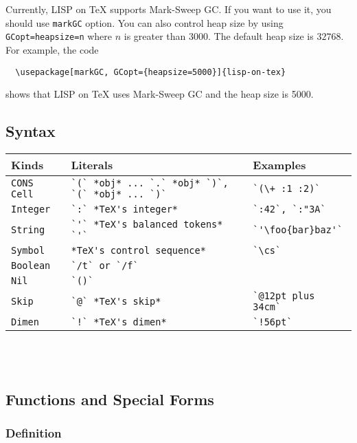 \documentclass[10pt,a4paper]{article}
\begin{document}
Currently, LISP on TeX supports Mark-Sweep GC.
If you want to use it, you should use \texttt{markGC} option.
You can also control heap size by using \texttt{GCopt={heapsize=n}}
where $n$ is greater than $3000$. The default heap size is $32768$.
For example, the code
%
\begin{verbatim}
  \usepackage[markGC, GCopt={heapsize=5000}]{lisp-on-tex}
\end{verbatim}
%
shows that LISP on TeX uses Mark-Sweep GC and the heap size is 5000.

\subsection{Syntax}
\begin{tabular}{|l|l|l}
\hline 
Kinds  & Literals   & Examples \\        
\hline\hline
\tt{CONS Cell} & \verb|`(` *obj* ... `.` *obj* `)`, `(` *obj* ... `)`| & \verb|`(\+ :1 :2)`     | \\
\tt{Integer}   & \verb|`:` *TeX's integer*|                            & \verb|`:42`, `:"3A`    | \\
\tt{String}    & \verb|`'` *TeX's balanced tokens* `'`|                & \verb|`'\foo{bar}baz'` | \\
\tt{Symbol}    & \verb|*TeX's control sequence*|                       & \verb|`\cs`            | \\
\tt{Boolean}   & \verb|`/t` or `/f`|                                   & \verb|                 | \\
\tt{Nil}       & \verb|`()`|                                           & \verb|                 | \\
\tt{Skip}      & \verb|`@` *TeX's skip*|                               & \verb|`@12pt plus 34cm`| \\
\tt{Dimen}     & \verb|`!` *TeX's dimen*|                              & \verb|`!56pt`          | \\
\hline 
\end{tabular} \\ \\


\subsection{Functions and Special Forms}

\subsubsection{Definition}
\end{document}
